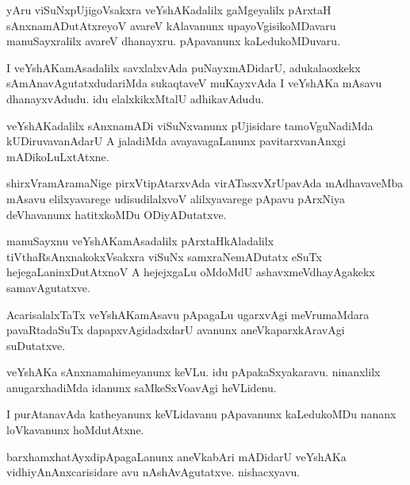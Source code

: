 \documentclass{article}
\begin{document}
\begin{mn}%
yAru viSuNxpUjigoVsakxra veYshAKadalilx gaMgeyalilx pArxtaH sAnxnamADutAtxreyoV avareV 
kAlavanunx upayoVgisikoMDavaru manuSayxralilx avareV dhanayxru. pApavanunx kaLedukoMDuvaru.
\end{mn}

\begin{mn}%
I veYshAKamAsadalilx savxlalxvAda puNayxmADidarU, adukalaoxkekx sAmAnavAgutatxdudariMda 
sukaqtaveV muKayxvAda I veYshAKa mAsavu dhanayxvAdudu. idu elalxkikxMtalU adhikavAdudu.
\end{mn}

\begin{mn}%
veYshAKadalilx sAnxnamADi viSuNxvanunx pUjisidare tamoVguNadiMda kUDiruvavanAdarU A 
jaladiMda avayavagaLanunx pavitarxvanAnxgi mADikoLuLxtAtxne.
\end{mn}

\begin{mn}%
shirxVramAramaNige pirxVtipAtarxvAda virATasxvXrUpavAda mAdhavaveMba mAsavu elilxyavarege 
udisudilalxvoV alilxyavarege pApavu pArxNiya deVhavanunx hatitxkoMDu ODiyADutatxve.
\end{mn}

\begin{mn}%
manuSayxnu veYshAKamAsadalilx pArxtaHkAladalilx tiVthaRsAnxnakokxVsakxra viSuNx 
samxraNemADutatx eSuTx hejegaLaninxDutAtxnoV A hejejxgaLu oMdoMdU ashavxmeVdhayAgakekx 
samavAgutatxve.
\end{mn}

\begin{mn}%
AcarisalalxTaTx veYshAKamAsavu pApagaLu ugarxvAgi meVrumaMdara pavaRtadaSuTx 
dapapxvAgidadxdarU avanunx aneVkaparxkAravAgi suDutatxve.
\end{mn}

\begin{mn}%
veYshAKa sAnxnamahimeyanunx keVLu. idu pApakaSxyakaravu. ninanxlilx anugarxhadiMda idanunx 
saMkeSxVoavAgi heVLidenu.
\end{mn}

\begin{mn}%
I purAtanavAda katheyanunx keVLidavanu pApavanunx kaLedukoMDu nananx loVkavanunx hoMdutAtxne.
\end{mn}

\begin{mn}%
barxhamxhatAyxdipApagaLanunx aneVkabAri mADidarU veYshAKa vidhiyAnAnxcarisidare avu 
nAshAvAgutatxve. nishacxyavu.
\end{mn}
\end{document}
